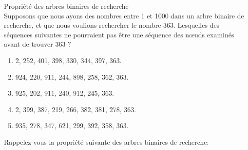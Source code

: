     \begin{Exercice}[10 minutes] Propriété des arbres binaires de recherche\\

    Supposons que nous ayons des nombres entre 1 et 1000 dans un arbre binaire de recherche, et que nous voulions rechercher le nombre 363. Lesquelles des séquences suivantes ne pourraient pas être une séquence des nœuds examinés avant de trouver 363 ?

    \begin{enumerate}
        \item 2, 252, 401, 398, 330, 344, 397, 363.
        \item 924, 220, 911, 244, 898, 258, 362, 363.
        \item 925, 202, 911, 240, 912, 245, 363.
        \item 2, 399, 387, 219, 266, 382, 381, 278, 363.
        \item 935, 278, 347, 621, 299, 392, 358, 363. 
    \end{enumerate}

    \begin{conseil}
        Rappelez-vous la propriété suivante des arbres binaires de recherche:
        \begin{center}
\end{center}
\end{conseil}
\end{Exercice}
